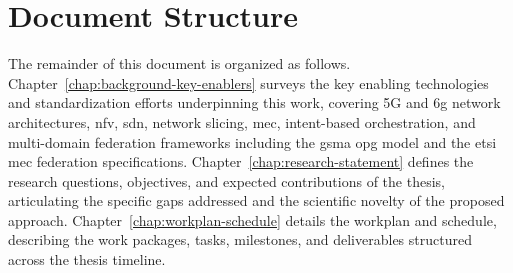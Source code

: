 \section{Document Structure}

The remainder of this document is organized as follows. Chapter~\ref{chap:background-key-enablers} surveys the key enabling technologies and standardization efforts underpinning this work, covering 5G and \ac{6g} network architectures, \ac{nfv}, \ac{sdn}, network slicing, \ac{mec}, intent-based orchestration, and multi-domain federation frameworks including the \ac{gsma} \ac{opg} model and the \ac{etsi} \ac{mec} federation specifications. Chapter~\ref{chap:research-statement} defines the research questions, objectives, and expected contributions of the thesis, articulating the specific gaps addressed and the scientific novelty of the proposed approach. Chapter~\ref{chap:workplan-schedule} details the workplan and schedule, describing the work packages, tasks, milestones, and deliverables structured across the thesis timeline.